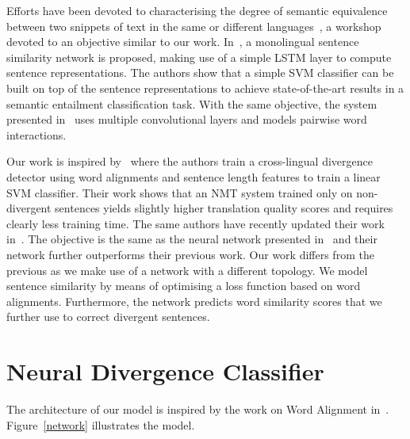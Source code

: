 \documentclass[11pt,a4paper]{article}
\begin{document}
Efforts have been devoted to characterising the degree of semantic equivalence between two snippets of text in the same or different languages~\cite{conf/semeval/AgirreBCDGMRW16}, a workshop devoted to an objective similar to our work. 
In~\cite{Mueller:2016:SRA:3016100.3016291}, a monolingual sentence similarity network is proposed, making use of a simple LSTM layer to compute sentence representations. 
The authors show that a simple SVM classifier can be built on top of the sentence representations to achieve state-of-the-art results in a semantic entailment classification task. 
With the same objective, the system presented in~\cite{N16-1108} uses multiple convolutional layers and models pairwise word interactions. %

Our work is inspired by~\cite{W17-3209} where the authors train a cross-lingual divergence detector using word alignments and sentence length features to train a linear SVM classifier. 
Their work shows that an NMT system trained only on non-divergent sentences yields slightly higher translation quality scores and requires clearly less training time. 
The same authors have recently updated their work in~\cite{N18-1136}. 
The objective is the same as the neural network presented in~\cite{N16-1108} and their network further outperforms their previous work. 
Our work differs from the previous as we make use of a network with a different topology. 
We model sentence similarity by means of optimising a loss function based on word alignments. 
Furthermore, the network predicts word similarity scores that we further use to correct divergent sentences.

\section{Neural Divergence Classifier}
\label{sec:divergence}

The architecture of our model is inspired by the work on Word Alignment in~\cite{W16-2207}. Figure~\ref{network} illustrates the model.
\end{document}
